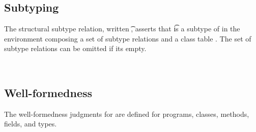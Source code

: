 \documentclass[a4paper,USenglish]{tex/lipics-v2016}
\begin{document}
\clearpage

\subsection{Subtyping}

The structural subtype relation, written \StrSub\M\K\t\tp, asserts that \t
is a subtype of \tp in the environment \M composing a set of subtype relations and
a class table \K.   The set of subtype relations can be omitted if its empty.

~\\

\begin{mathpar}


\end{mathpar}

\begin{mathpar}


\end{mathpar}

\subsection{Well-formedness}

The well-formedness judgments for \kafka are defined for programs, classes, methods, fields, and types.

~\\


\begin{mathpar}
\end{mathpar}
\end{document}
